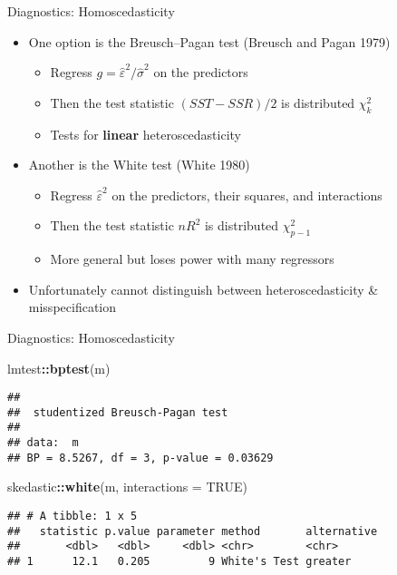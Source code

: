 \documentclass[
  ignorenonframetext,
]{beamer}
\newenvironment{Shaded}{\begin{snugshade}}{\end{snugshade}}
\newcommand{\AttributeTok}[1]{\textcolor[rgb]{0.13,0.29,0.53}{#1}}
\newcommand{\ConstantTok}[1]{\textcolor[rgb]{0.56,0.35,0.01}{#1}}
\newcommand{\FunctionTok}[1]{\textcolor[rgb]{0.13,0.29,0.53}{\textbf{#1}}}
\newcommand{\NormalTok}[1]{#1}
\newcommand{\SpecialCharTok}[1]{\textcolor[rgb]{0.81,0.36,0.00}{\textbf{#1}}}
\providecommand{\tightlist}{%
  \setlength{\itemsep}{0pt}\setlength{\parskip}{0pt}}
\newcommand{\setsep}{\setlength{\itemsep}{3pt}}
\newcommand{\setskip}{\setlength{\parskip}{3pt}}
\renewcommand{\tightlist}{\setsep\setskip}
\begin{document}
\begin{frame}{Diagnostics: Homoscedasticity}
\protect\hypertarget{diagnostics-homoscedasticity-4}{}
\begin{itemize}[<+->]
\tightlist
\item
  One option is the Breusch--Pagan test (Breusch and Pagan 1979)

  \begin{itemize}[<+->]
  \tightlist
  \item
    Regress \(g = \hat{\varepsilon}^2 / \hat{\sigma}^2\) on the predictors
  \item
    Then the test statistic \((SST - SSR) / 2\) is distributed \(\chi_k^2\)
  \item
    Tests for \textbf{linear} heteroscedasticity
  \end{itemize}
\item
  Another is the White test (White 1980)

  \begin{itemize}[<+->]
  \tightlist
  \item
    Regress \(\hat{\varepsilon}^2\) on the predictors, their squares, and interactions
  \item
    Then the test statistic \(nR^2\) is distributed \(\chi_{p-1}^2\)
  \item
    More general but loses power with many regressors
  \end{itemize}
\item
  Unfortunately cannot distinguish between heteroscedasticity \& misspecification
\end{itemize}
\end{frame}

\begin{frame}[fragile]{Diagnostics: Homoscedasticity}
\protect\hypertarget{diagnostics-homoscedasticity-5}{}
\begin{Shaded}
\begin{Highlighting}[]
\NormalTok{lmtest}\SpecialCharTok{::}\FunctionTok{bptest}\NormalTok{(m)}
\end{Highlighting}
\end{Shaded}

\begin{verbatim}
## 
##  studentized Breusch-Pagan test
## 
## data:  m
## BP = 8.5267, df = 3, p-value = 0.03629
\end{verbatim}

\begin{Shaded}
\begin{Highlighting}[]
\NormalTok{skedastic}\SpecialCharTok{::}\FunctionTok{white}\NormalTok{(m, }\AttributeTok{interactions =} \ConstantTok{TRUE}\NormalTok{)}
\end{Highlighting}
\end{Shaded}

\begin{verbatim}
## # A tibble: 1 x 5
##   statistic p.value parameter method       alternative
##       <dbl>   <dbl>     <dbl> <chr>        <chr>      
## 1      12.1   0.205         9 White's Test greater
\end{verbatim}
\end{frame}
\end{document}
